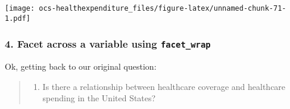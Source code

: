 \documentclass[]{article}
\newenvironment{Shaded}{\begin{snugshade}}{\end{snugshade}}
\newcommand{\CommentTok}[1]{\textcolor[rgb]{0.56,0.35,0.01}{\textit{#1}}}
\newcommand{\DataTypeTok}[1]{\textcolor[rgb]{0.13,0.29,0.53}{#1}}
\newcommand{\KeywordTok}[1]{\textcolor[rgb]{0.13,0.29,0.53}{\textbf{#1}}}
\newcommand{\NormalTok}[1]{#1}
\newcommand{\OperatorTok}[1]{\textcolor[rgb]{0.81,0.36,0.00}{\textbf{#1}}}
\newcommand{\StringTok}[1]{\textcolor[rgb]{0.31,0.60,0.02}{#1}}
\providecommand{\tightlist}{%
  \setlength{\itemsep}{0pt}\setlength{\parskip}{0pt}}
\begin{document}
\begin{Shaded}
\end{Shaded}

\texttt{[image: ocs-healthexpenditure\_files/figure-latex/unnamed-chunk-71-1.pdf]}

\hypertarget{facet-across-a-variable-using-facet_wrap}{%
\subsubsection{\texorpdfstring{4. Facet across a variable using
\texttt{facet\_wrap}}{4. Facet across a variable using facet\_wrap}}\label{facet-across-a-variable-using-facet_wrap}}

Ok, getting back to our original question:

\begin{quote}
\begin{enumerate}
\def\labelenumi{\arabic{enumi}.}
\tightlist
\item
  Is there a relationship between healthcare coverage and healthcare
  spending in the United States?
\end{enumerate}
\end{quote}
\end{document}
